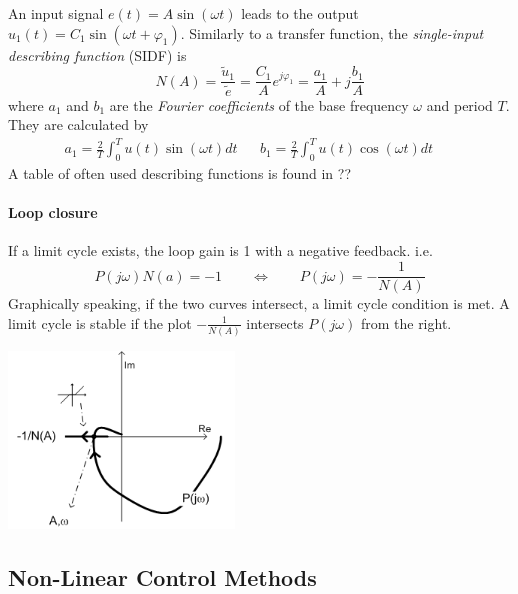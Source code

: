 An input signal $e(t) = A \sin(\omega t)$ leads to the output $u_1(t) = C_1 \sin(\omega t + \varphi_1)$.
Similarly to a  transfer function, the \emph{single-input describing function} (SIDF) is
\[
    N(A) = \frac{\tilde{u}_1}{\tilde{e}} = \frac{C_1}{A} e^{j\varphi_1} = \frac{a_1}{A} + j \frac{b_1}{A}
\]
where $a_1$ and $b_1$ are the \emph{Fourier coefficients} of the base frequency $\omega$
and period $T$. They are calculated by
\begin{align*}
    a_1 = \frac{2}{T} \int_0^T u(t) \sin(\omega t) dt &&
    b_1 = \frac{2}{T} \int_0^T u(t) \cos(\omega t) dt &&
\end{align*}
A table of often used describing functions is found in ??

\begin{minipage}{10cm}
    \paragraph{Loop closure}
    If a limit cycle exists, the loop gain is 1 with a negative feedback. i.e.
    \[
        P(j\omega) N(a) = -1 \qquad \Leftrightarrow \qquad P(j\omega) = -\frac{1}{N(A)}
    \]
    Graphically speaking, if the two curves intersect, a limit cycle condition is met.
    A limit cycle is stable if the plot $-\frac{1}{N(A)}$ intersects $P(j\omega)$ from the right.
    
\end{minipage}
\hspace{0.5cm}
\begin{minipage}{8cm}
    \centering
    \includegraphics[width=6cm]{bilder/nonlinear_loopclosure.png}
\end{minipage}

\newpage
\subsection{Non-Linear Control Methods}

